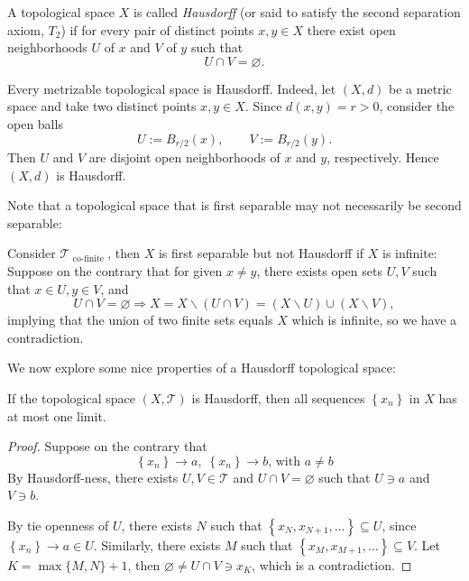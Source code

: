 \begin{definition}
\label{def:Hausdorff}
A topological space \(X\) is called \emph{Hausdorff} (or said to satisfy the second separation axiom, \(T_2\)) if for every pair of distinct points \(x,y \in X\) there exist open neighborhoods \(U\) of \(x\) and \(V\) of \(y\) such that
\[
U \cap V = \varnothing.
\]
\end{definition}
\begin{example}
Every metrizable topological space is Hausdorff.  
Indeed, let \((X,d)\) be a metric space and take two distinct points \(x,y \in X\).  
Since \(d(x,y) = r > 0\), consider the open balls
\[
U := B_{r/2}(x), \qquad V := B_{r/2}(y).
\]
Then \(U\) and \(V\) are disjoint open neighborhoods of \(x\) and \(y\), respectively.  
Hence \((X,d)\) is Hausdorff.
\end{example}
Note that a topological space that is first separable may not necessarily be second separable:
\begin{example}
Consider \({\mathcal{T}}_{\text{ co-finite }}\), then \(X\) is first separable but not Hausdorff if \(X\) is infinite: Suppose on the contrary that for given \(x \neq  y\), there exists open sets \(U,V\) such that \(x \in  U,y \in  V\), and
\[
U \cap  V = \varnothing  \Rightarrow  X = X \smallsetminus  \left( {U \cap  V}\right)  = \left( {X \smallsetminus  U}\right)  \cup  \left( {X \smallsetminus  V}\right),
\]
implying that the union of two finite sets equals \(X\) which is infinite, so we have a contradiction.
\end{example}

We now explore some nice properties of a Hausdorff topological space:
\begin{proposition} If the topological space $(X, \mathcal{T})$ is Hausdorff, then all sequences \(\left\{  {x}_{n}\right\}\) in \(X\) has at most one limit.
\end{proposition}
\begin{proof} Suppose on the contrary that
\[
\left\{  {x}_{n}\right\}   \rightarrow  a,\;\left\{  {x}_{n}\right\}   \rightarrow  b\text{, with }a \neq  b
\]
By Hausdorff-ness, there exists \(U,V \in  \mathcal{T}\) and \(U \cap  V = \varnothing\) such that \(U \ni  a\) and \(V \ni  b\).

By tie openness of \(U\), there exists \(N\) such that \(\left\{  {{x}_{N},{x}_{N + 1},\ldots }\right\}   \subseteq  U\), since \(\left\{  {x}_{n}\right\}   \rightarrow  a \in  U\). Similarly, there exists \(M\) such that \(\left\{  {{x}_{M},{x}_{M + 1},\ldots }\right\}   \subseteq  V\). Let \(K = \max \{ M,N\}  + 1\), then \(\varnothing  \neq  U \cap  V \ni  {x}_{K}\), which is a contradiction.
\end{proof}

